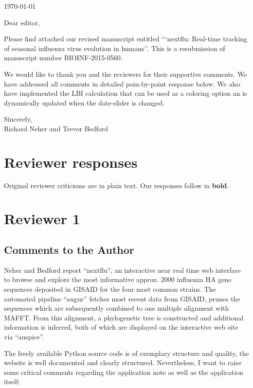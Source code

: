 \documentclass[11pt,oneside,letterpaper]{article}
\begin{document}

\today

\vspace{1cm}

Dear editor,

Please find attached our revised manuscript entitled ```nextflu: Real-time tracking of seasonal influenza virus evolution in humans''.  This is a resubmission of manuscript number BIOINF-2015-0560.

We would like to thank you and the reviewers for their supportive comments. We have addressed all comments in detailed poin-by-point response below. We also have implemented the LBI calculation that can be used as a coloring option an is dynamically updated when the date-slider is changed.

Sincerely,\\
Richard Neher and Trevor Bedford

\restoregeometry

\newpage

\section*{Reviewer responses}

Original reviewer criticisms are in plain text.  Our responses follow in \textbf{bold}.  


\section*{Reviewer 1}

\subsection*{Comments to the Author}

Neher and Bedford report ``nextflu'', an interactive near real time web interface to browse and explore the most informative approx. 2000 influenza HA gene sequences deposited in GISAID for the four most common strains. The automated pipeline ``augur'' fetches most recent data from GISAID, prunes the sequences which are subsequently combined to one multiple alignment with MAFFT. From this alignment, a phylogenetic tree is constructed and additional information is inferred, both of which are displayed on the interactive web site via ``auspice''.

The freely available Python source code is of exemplary structure and quality, the website is well documented and clearly structured. Nevertheless, I want to raise some critical comments regarding the application note as well as the application itself:
\end{document}
